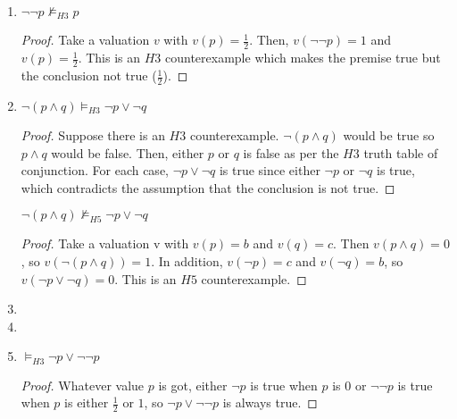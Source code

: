 \begin{enumerate}[label=\roman*.]
\item \leavevmode \vspace{-1.75\baselineskip}
\begin{claim}
$\neg\neg p \not\vDash_{H3} p$
\end{claim}
\begin{proof}
Take a valuation $v$ with $v(p) = \frac{1}{2}$. Then, $v(\neg\neg p) = 1$ and $v(p) = \frac{1}{2}$. This is an $H3$ counterexample which makes the premise true but the conclusion not true ($\frac{1}{2}$).
\end{proof}


\item \leavevmode \vspace{-1.75\baselineskip}
\begin{claim}
$\neg (p \land q) \vDash_{H3} \neg p \lor \neg q$
\end{claim}
\begin{proof}
Suppose there is an $H3$ counterexample. $\neg (p \land q)$ would be true so $p \land q$ would be false. Then, either $p$ or $q$ is false as per the $H3$ truth table of conjunction. For each case, $\neg p \lor \neg q$ is true since either $\neg p$ or $\neg q$ is true, which contradicts the assumption that the conclusion is not true.
\end{proof}

\begin{claim}
$\neg (p \land q) \not\vDash_{H5} \neg p \lor \neg q$
\end{claim}
\begin{proof}
Take a valuation v with $v(p) = b$ and $v(q) = c$. Then $v(p \land q) = 0$, so $v(\neg (p \land q)) = 1$. In addition, $v(\neg p) = c$ and $v(\neg q) = b$, so $v(\neg p \lor \neg q) = 0$. This is an $H5$ counterexample.
\end{proof}


\item

\item

\item \leavevmode \vspace{-1.75\baselineskip}
\begin{claim}
$\vDash_{H3} \neg p \lor \neg\neg p$
\end{claim}
\begin{proof}
Whatever value $p$ is got, either $\neg p$ is true when $p$ is $0$ or $\neg\neg p$ is true when $p$ is either $\frac{1}{2}$ or $1$, so $\neg p \lor \neg\neg p$ is always true.
\end{proof}


\end{enumerate}
